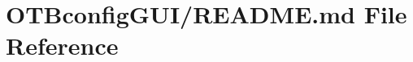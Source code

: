 \hypertarget{_o_t_bconfig_g_u_i_2_r_e_a_d_m_e_8md}{}\section{O\+T\+Bconfig\+G\+U\+I/\+R\+E\+A\+D\+ME.md File Reference}
\label{_o_t_bconfig_g_u_i_2_r_e_a_d_m_e_8md}
